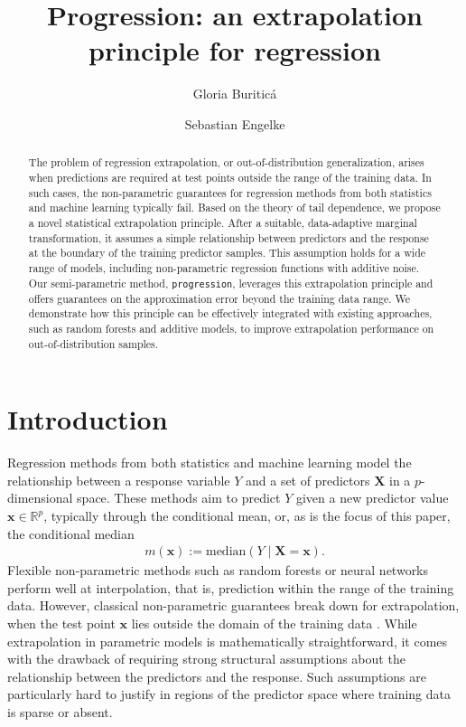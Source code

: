 \documentclass{statsoc}
\title[Progression: an extrapolation principle for regression]{Progression: an extrapolation principle for regression}
\author{Gloria Buritic\'a}
\author[G. Buritic\'a and S.~Engelke]{Sebastian Engelke}
\theoremstyle{break}
\def\g{\mathbf}
\def\M{\text{median}}
\begin{document}
\begin{abstract}
	The problem of regression extrapolation, or out-of-distribution generalization, arises when predictions are required at test points outside the range of the training data. In such cases, the non-parametric guarantees for regression methods from both statistics and machine learning typically fail. Based on the theory of tail dependence, we propose a novel statistical extrapolation principle. After a suitable, data-adaptive marginal transformation, it assumes a simple relationship between predictors and the response at the boundary of the training predictor samples.	
	This assumption holds for a wide range of models, including non-parametric regression functions with additive noise. Our semi-parametric method, \texttt{progression}, leverages this extrapolation principle and offers guarantees on the approximation error beyond the training data range.
	We demonstrate how this principle can be effectively integrated with existing approaches, such as random forests and additive models, to improve extrapolation performance on out-of-distribution samples.
\end{abstract}





\section{Introduction}

Regression methods from both statistics and machine learning model the relationship between a response variable $Y$ and a set of predictors $\mathbf X$ in a $p$-dimensional space. These methods aim to predict $Y$ given a new predictor value $\g x\in \mathbb R^p$, typically through the conditional mean, or, as is the focus of this paper, the conditional median
\begin{align}\label{cond_median}
	 m(\g x) := \M(Y \mid \g X = \g x). 
\end{align}
Flexible non-parametric methods such as random forests or neural networks perform well at interpolation, that is, prediction within the range of the training data. 
However, classical non-parametric guarantees break down for extrapolation, when the test point $\g x$ lies outside the domain of the training data \citep{xu2021how}. While extrapolation in parametric models is mathematically straightforward, it comes with the drawback of requiring strong structural assumptions about the relationship between the predictors and the response. Such assumptions are particularly hard to justify in regions of the predictor space where training data is sparse or absent.
\end{document}
